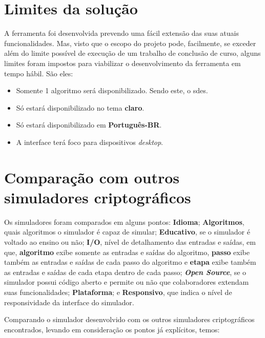 \section{Limites da solução}
A ferramenta foi desenvolvida prevendo uma fácil extensão das suas atuais funcionalidades. Mas, visto que o escopo do projeto pode, facilmente, se exceder além do limite possível de execução de um trabalho de conclusão de curso, alguns limites foram impostos para viabilizar o desenvolvimento da ferramenta em tempo hábil. São eles:
\begin{itemize}
    \item Somente 1 algoritmo será disponibilizado. Sendo este, o \acrfull{sdes}.
    \item Só estará disponibilizado no tema \textbf{claro}.
    \item Só estará disponibilizado em \textbf{Português-BR}.
    \item A interface terá foco para dispositivos \textit{desktop}.
\end{itemize}

\section{Comparação com outros simuladores criptográficos}
Os simuladores foram comparados em alguns pontos: \textbf{Idioma}; \textbf{Algoritmos}, quais algoritmos o simulador é capaz de simular; \textbf{Educativo}, se o simulador é voltado ao ensino ou não; \textbf{I/O}, nível de detalhamento das entradas e saídas, em que, \textbf{algoritmo} exibe somente as entradas e saídas do algoritmo, \textbf{passo} exibe também as entradas e saídas de cada passo do algoritmo e \textbf{etapa} exibe também as entradas e saídas de cada etapa dentro de cada passo; \textbf{\textit{Open Source}}, se o simulador possui código aberto e permite ou não que colaboradores extendam suas funcionalidades; \textbf{Plataforma}; e \textbf{Responsivo}, que indica o nível de responsividade da interface do simulador.

Comparando o simulador desenvolvido com os outros simuladores criptográficos encontrados, levando em consideração os pontos já explícitos, temos:

